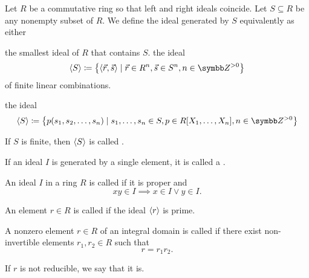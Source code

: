 \begin{definition}\label{def:generated_ring_ideal}
  Let \( R \) be a commutative ring so that left and right ideals coincide. Let \( S \subseteq R \) be any nonempty subset of \( R \). We define the ideal generated by \( S \) equivalently as either
  \begin{defenum}
     the smallest ideal of \( R \) that contains \( S \).
     the ideal
    \begin{equation*}
      \Gen S \coloneqq \left\{ \Prod {\vec r} {\vec s} \mid \vec r \in R^n, \vec s \in S^n, n \in \Z^{>0} \right\}
    \end{equation*}
    of finite linear combinations.

     the ideal
    \begin{equation*}
      \Gen S \coloneqq \left\{ p(s_1, s_2, \ldots, s_n) \mid s_1, \ldots, s_n \in S, p \in R[X_1, \ldots, X_n], n \in \Z^{>0} \right\}
    \end{equation*}
  \end{defenum}

  If \( S \) is finite, then \( \left\langle S \right\rangle \) is called .
\end{definition}

\begin{definition}\label{def:principal_ideal}
  If an ideal \( I \) is generated by a single element, it is called a .
\end{definition}

\begin{definition}\label{def:prime_ring_ideal}
  An ideal \( I \) in a ring \( R \) is called  if it is proper and
  \begin{equation*}
    xy \in I \implies x \in I \lor y \in I.
  \end{equation*}

  An element \( r \in R \) is called  if the ideal \( \left\langle r \right\rangle \) is prime.
\end{definition}

\begin{definition}\label{def:irreducible_ring_element}\cite[388]{Knapp2016BAlg}
  A nonzero element \( r \in R \) of an integral domain is called  if there exist non-invertible elements \( r_1, r_2 \in R \) such that
  \begin{equation*}
    r = r_1 r_2.
  \end{equation*}

  If \( r \) is not reducible, we say that it is.
\end{definition}

